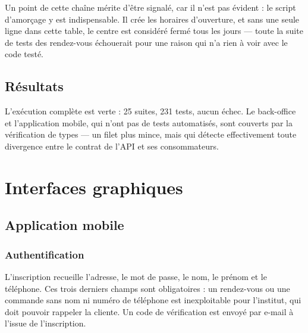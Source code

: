 Un point de cette chaîne mérite d'être signalé, car il n'est pas évident : le
script d'amorçage y est indispensable. Il crée les horaires d'ouverture, et
sans une seule ligne dans cette table, le centre est considéré fermé tous les
jours --- toute la suite de tests des rendez-vous échouerait pour une raison
qui n'a rien à voir avec le code testé.


\subsection{Résultats}


L'exécution complète est verte : 25 suites, 231 tests, aucun échec. Le
back-office et l'application mobile, qui n'ont pas de tests automatisés, sont
couverts par la vérification de types --- un filet plus mince, mais qui détecte
effectivement toute divergence entre le contrat de l'API et ses consommateurs.

\section{Interfaces graphiques}

\subsection{Application mobile}

\subsubsection{Authentification}


L'inscription recueille l'adresse, le mot de passe, le nom, le prénom et le
téléphone. Ces trois derniers champs sont obligatoires : un rendez-vous ou une
commande sans nom ni numéro de téléphone est inexploitable pour l'institut, qui
doit pouvoir rappeler la cliente. Un code de vérification est envoyé par
e-mail à l'issue de l'inscription.


